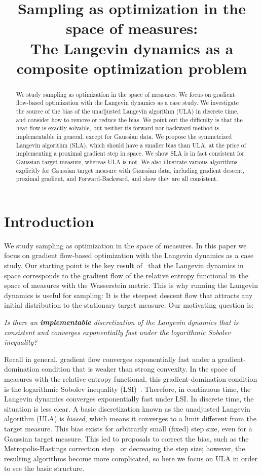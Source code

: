 \documentclass[final,12pt]{colt2018}
\title[Sampling as optimization in the space of measures]{
Sampling as optimization in the space of measures: \\
The Langevin dynamics as a composite optimization problem}
\begin{document}
\maketitle

\begin{abstract}
We study sampling as optimization in the space of measures.
We focus on gradient flow-based optimization with the Langevin dynamics as a case study.
We investigate the source of the bias of the unadjusted Langevin algorithm (ULA) in discrete time, and consider how to remove or reduce the bias.
We point out the difficulty is that the heat flow is exactly solvable, but neither its forward nor backward method is implementable in general, except for Gaussian data.
We propose the symmetrized Langevin algorithm (SLA), which should have a smaller bias than ULA, at the price of implementing a proximal gradient step in space.
We show SLA is in fact consistent for Gaussian target measure, whereas ULA is not.
We also illustrate various algorithms explicitly for Gaussian target measure with Gaussian data, including gradient descent, proximal gradient, and Forward-Backward, and show they are all consistent.
\end{abstract}


\section{Introduction}
We study sampling as optimization in the space of measures.
In this paper 
we focus on gradient flow-based optimization with the Langevin dynamics as a case study.
Our starting point is the key result of~\cite{JKO98} that the Langevin dynamics in space corresponds to the gradient flow of the relative entropy functional in the space of measures with the Wasserstein metric.
This is why running the Langevin dynamics is useful for sampling: It is the steepest descent flow that attracts any initial distribution to the stationary target measure.
Our motivating question is:
\begin{center}
{\em
Is there an {\bf implementable} discretization of the Langevin dynamics that is consistent and converges exponentially fast under the logarithmic Sobolev inequality?
}
\end{center}

Recall in general, gradient flow converges exponentially fast under a gradient-domination condition that is weaker than strong convexity.
In the space of measures with the relative entropy functional, this gradient-domination condition is the logarithmic Sobolev inequality (LSI)~\cite[]{OV00}.
Therefore, in continuous time, the Langevin dynamics converges exponentially fast under LSI.
In discrete time, the situation is less clear.
A basic discretization known as the unadjusted Langevin algorithm (ULA) is {\em biased}, which means it converges to a limit different from the target measure.
This bias exists for arbitrarily small (fixed) step size, even for a Gaussian target measure.
This led to proposals to correct the bias, such as the Metropolis-Hastings correction step~\cite[]{RT96,DCWY18} or decreasing the step size; however, the resulting algorithms become more complicated, so here we focus on ULA in order to see the basic structure.
\end{document}
